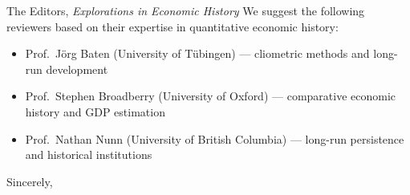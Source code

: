 \documentclass[11pt]{letter}
\begin{document}
\begin{letter}{The Editors, \emph{Explorations in Economic History}}
We suggest the following reviewers based on their expertise in quantitative economic history:
\begin{itemize}
\item Prof.\ J\"org Baten (University of T\"ubingen) --- cliometric methods and long-run development
\item Prof.\ Stephen Broadberry (University of Oxford) --- comparative economic history and GDP estimation
\item Prof.\ Nathan Nunn (University of British Columbia) --- long-run persistence and historical institutions
\end{itemize}

\closing{Sincerely,}
\end{letter}
\end{document}
